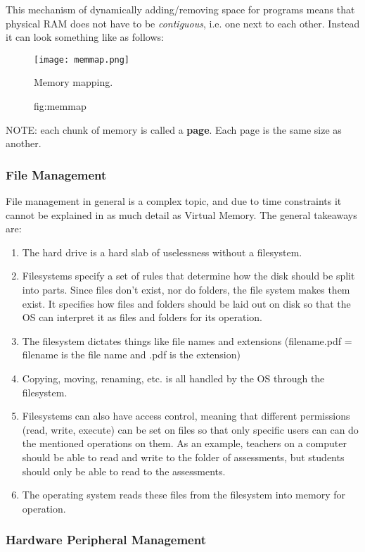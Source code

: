 \documentclass[../main.tex]{subfiles}
\begin{document}
This mechanism of dynamically adding/removing space for programs means that physical RAM does not have to be \emph{contiguous}, i.e. one next to each other. Instead it can look something like as follows:

\begin{figure}[H]
    \centering
    \texttt{[image: memmap.png]}
    \caption{Memory mapping.}
    \caption{fig:memmap}
\end{figure}

NOTE: each chunk of memory is called a \textbf{page}. Each page is the same size as another.

\subsubsection{File Management}

File management in general is a complex topic, and due to time constraints it cannot be explained in as much detail as Virtual Memory. The general takeaways are:

\begin{enumerate}
    \item The hard drive is a hard slab of uselessness without a filesystem.
    \item Filesystems specify a set of rules that determine how the disk should be split into parts. Since files don't exist, nor do folders, the file system makes them exist. It specifies how files and folders should be laid out on disk so that the OS can interpret it as files and folders for its operation.
    \item The filesystem dictates things like file names and extensions (filename.pdf = filename is the file name and .pdf is the extension)
    \item Copying, moving, renaming, etc. is all handled by the OS through the filesystem.
    \item Filesystems can also have access control, meaning that different permissions (read, write, execute) can be set on files so that only specific users can can do the mentioned operations on them. As an example, teachers on a computer should be able to read and write to the folder of assessments, but students should only be able to read to the assessments.
    \item The operating system reads these files from the filesystem into memory for operation.
\end{enumerate}

\subsubsection{Hardware Peripheral Management}
\end{document}
